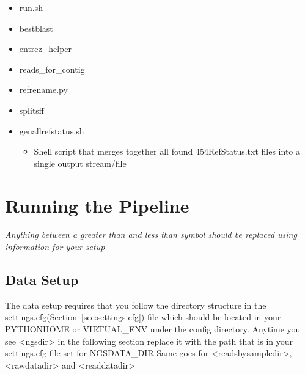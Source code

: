 \documentclass{article}
\begin{document}
\begin{itemize}
\begin{itemize}
    \end{itemize}
  \item run.sh
  \item bestblast
  \item entrez\_helper
  \item reads\_for\_contig
  \item refrename.py
  \item splitsff
  \item genallrefstatus.sh
   \begin{itemize}
    \item Shell script that merges together all found 454RefStatus.txt files into a single output stream/file
   \end{itemize}
 \end{itemize}

\section{Running the Pipeline}

\textit{Anything between a greater than and less than symbol should be replaced using information for your setup}

\subsection{Data Setup}

The data setup requires that you follow the directory structure in the settings.cfg(Section~\ref{sec:settings.cfg}) file which should be located in your PYTHONHOME or VIRTUAL\_ENV under the config directory.
Anytime you see <ngsdir> in the following section replace it with the path that is in your settings.cfg file set for NGSDATA\_DIR
Same goes for <readsbysampledir>, <rawdatadir> and <readdatadir>
\end{document}
